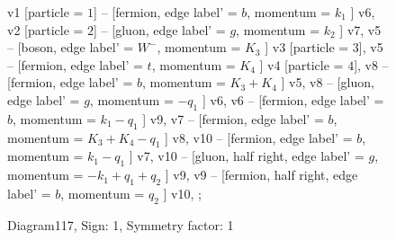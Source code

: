 \documentclass{revtex4}
\begin{document}
\begin{figure}[!htb]
\begin{center}
{    %
v1 [particle = \(1\)] -- [fermion, edge label' = \(b\), momentum = \(k_{1}\) ] v6, 
v2 [particle = \(2\)] -- [gluon, edge label' = \(g\), momentum = \(k_{2}\) ] v7, 
v5 -- [boson, edge label' = \(W^{-}\), momentum = \(K_{3}\) ] v3 [particle = \(3\)], 
v5 -- [fermion, edge label' = \(t\), momentum = \(K_{4}\) ] v4 [particle = \(4\)], 
v8 -- [fermion, edge label' = \(b\), momentum = \(K_{3} + K_{4}\) ] v5, 
v8 -- [gluon, edge label' = \(g\), momentum = \(-q_{1}\) ] v6, 
v6 -- [fermion, edge label' = \(b\), momentum = \(k_{1} - q_{1}\) ] v9, 
v7 -- [fermion, edge label' = \(b\), momentum = \(K_{3} + K_{4} - q_{1}\) ] v8, 
v10 -- [fermion, edge label' = \(b\), momentum = \(k_{1} - q_{1}\) ] v7, 
v10 -- [gluon, half right, edge label' = \(g\), momentum = \(-k_{1} + q_{1} + q_{2}\) ] v9, 
v9 -- [fermion, half right, edge label' = \(b\), momentum = \(q_{2}\) ] v10, 
};
\end{center}
\caption{Diagram117, Sign: 1, Symmetry factor: 1}
\end{figure}
\newpage
\end{document}
